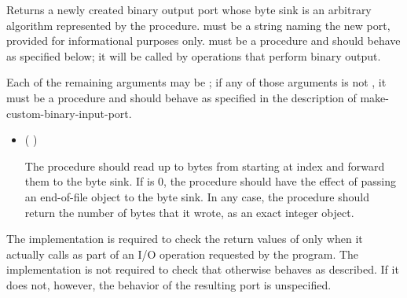 \begin{entry}{%
}

Returns a newly created binary output port whose byte sink is
an arbitrary algorithm represented by the  procedure.
 must be a string naming the new port,
provided for informational purposes only.
 must be a procedure and should behave as specified
below; it will be called by operations that perform binary output.

Each of the remaining arguments may be \schfalse{}; if any of
those arguments is not \schfalse{}, it must be a procedure and
should behave as specified in the description of
{\cf make-custom-binary-input-port}.
   
\begin{itemize}
\item {\cf (   )}
       
  The  procedure should read up to  bytes
  from  starting at index  and forward
  them to the byte sink.
  If  is 0, the  procedure should
  have the effect of passing an end-of-file object to the byte sink.
  In any case, the  procedure should return the number of
  bytes that it wrote, as an exact integer object.
\end{itemize}

\implresp The implementation is required to check the return
values of  only when it actually calls  as part of
an I/O operation requested by the program.  The implementation is not
required to check that  otherwise behaves as described.
If it does not, however, the behavior of the resulting port is
unspecified.
\end{entry}

